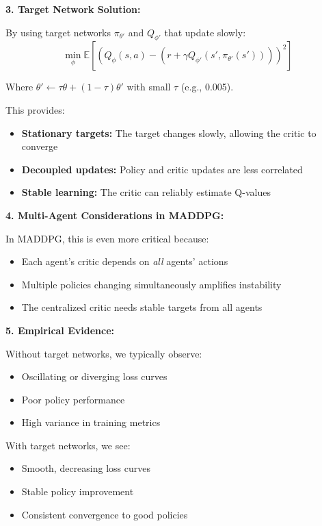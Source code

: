 \documentclass[12pt]{article}
\begin{document}
{{{{{{\begin{enumerate}
    \textbf{3. Target Network Solution:}
    
    By using target networks $\pi_{\theta'}$ and $Q_{\phi'}$ that update slowly:
    $$\min_\phi \mathbb{E}[(Q_\phi(s,a) - (r + \gamma Q_{\phi'}(s', \pi_{\theta'}(s'))))^2]$$
    
    Where $\theta' \leftarrow \tau\theta + (1-\tau)\theta'$ with small $\tau$ (e.g., 0.005).
    
    This provides:
    \begin{itemize}
        \item \textbf{Stationary targets:} The target changes slowly, allowing the critic to converge
        \item \textbf{Decoupled updates:} Policy and critic updates are less correlated
        \item \textbf{Stable learning:} The critic can reliably estimate Q-values
    \end{itemize}
    
    \textbf{4. Multi-Agent Considerations in MADDPG:}
    
    In MADDPG, this is even more critical because:
    \begin{itemize}
        \item Each agent's critic depends on \textit{all} agents' actions
        \item Multiple policies changing simultaneously amplifies instability
        \item The centralized critic needs stable targets from all agents
    \end{itemize}
    
    \textbf{5. Empirical Evidence:}
    
    Without target networks, we typically observe:
    \begin{itemize}
        \item Oscillating or diverging loss curves
        \item Poor policy performance
        \item High variance in training metrics
    \end{itemize}
    
    With target networks, we see:
    \begin{itemize}
        \item Smooth, decreasing loss curves
        \item Stable policy improvement
        \item Consistent convergence to good policies
    \end{itemize}
    

\end{enumerate}}}}}}}
\end{document}
